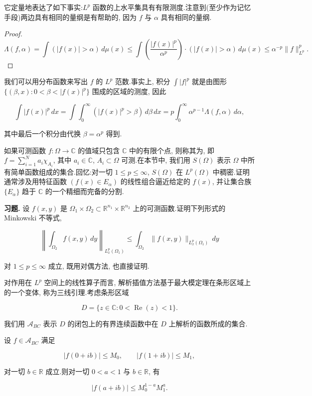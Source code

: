 它定量地表达了如下事实:$L^p$ 函数的上水平集具有有限测度.注意到(至少作为记忆手段)两边具有相同的量纲是有帮助的, 因为 $f$ 与 $\alpha$ 具有相同的量纲.

\begin{proof}
\[
\Lambda(f, \alpha) = \int(|f(x)| > \alpha)\, d\mu(x) \le \int\left(\frac{|f(x)|^p}{\alpha^p}\right)\cdot(|f(x)| > \alpha)\, d\mu(x) \le \alpha^{-p}\|f\|_{L^p}^p.
\]
\end{proof}

我们可以用分布函数来写出 $f$ 的 $L^p$ 范数.事实上, 积分 $\int|f|^p$ 就是由图形 $\{( \beta, x) : 0 < \beta < |f(x)|^p \}$ 围成的区域的测度, 因此

\begin{equation}
\int|f(x)|^p\, dx = \int\int_0^\infty (|f(x)|^p > \beta)\, d\beta\, dx = p\int_0^\infty \alpha^{p-1}\Lambda(f, \alpha)\, d\alpha, \label{eq:c6-181}
\end{equation}

其中最后一个积分由代换 $\beta = \alpha^p$ 得到.

如果可测函数 $f:\Omega\to\mathbb{C}$ 的值域只包含 $\mathbb{C}$ 中的有限个点, 则称其为, 即 $f = \sum_{i=1}^N a_i\chi_{A_i}$, 其中 $a_i\in\mathbb{C}$, $A_i\subset\Omega$ 可测.在本节中, 我们用 $S(\Omega)$ 表示 $\Omega$ 中所有简单函数组成的集合.回忆:对一切 $1\le p\le\infty$, $S(\Omega)$ 在 $L^p(\Omega)$ 中稠密.证明通常涉及用特征函数 $(f(x)\in E_\alpha)$ 的线性组合逼近给定的 $f(x)$, 并让集合族 $\{E_\alpha\}$ 趋于 $\mathbb{C}$ 的一个精细而完备的分割.

\textbf{习题.} 设 $f(x, y)$ 是 $\Omega_1\times\Omega_2\subset\mathbb{R}^{n_1}\times\mathbb{R}^{n_2}$ 上的可测函数.证明下列形式的 Minkowski 不等式,

\[
\left\|\int_{\Omega_2} f(x, y)\, dy\right\|_{L_x^p(\Omega_1)} \le \int_{\Omega_2}\|f(x, y)\|_{L_x^p(\Omega_1)}\, dy
\]

对 $1\le p\le\infty$ 成立, 既用对偶方法, 也直接证明.


对作用在 $L^p$ 空间上的线性算子而言, 解析插值方法基于最大模定理在条形区域上的一个变体, 称为三线引理.考虑条形区域

\[
D = \{z\in\mathbb{C} : 0 < \operatorname{Re}(z) < 1\}.
\]

我们用 $\mathcal{A}_{BC}$ 表示 $D$ 的闭包上的有界连续函数中在 $D$ 上解析的函数所成的集合.

\begin{lemma}[三线引理]\label{lem:c6-1.4}
设 $f\in\mathcal{A}_{BC}$ 满足

\[
|f(0+ib)| \le M_0, \qquad |f(1+ib)| \le M_1,
\]

对一切 $b\in\mathbb{R}$ 成立.则对一切 $0<a<1$ 与 $b\in\mathbb{R}$, 有

\[
|f(a+ib)| \le M_0^{1-a}M_1^a.
\]
\end{lemma}

